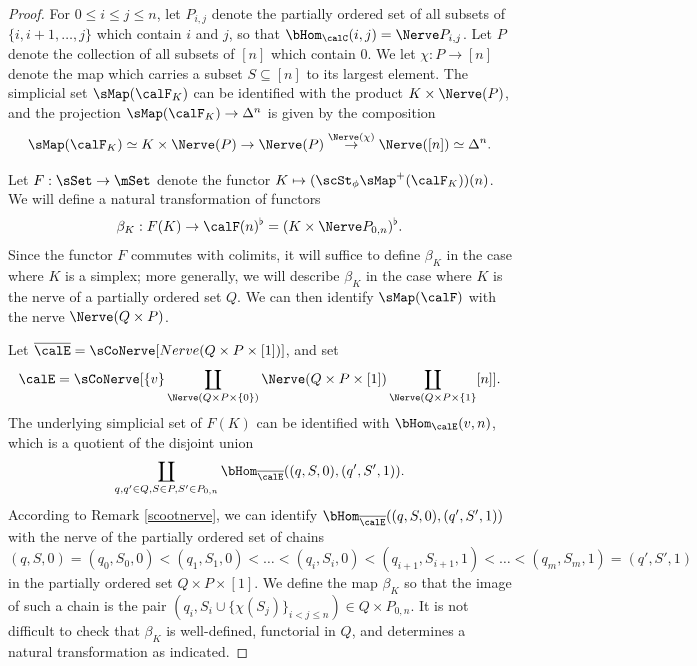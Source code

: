 \begin{proof}
For $0 \leq i \leq j \leq n$, let $P_{i,j}$ denote the partially ordered set of all subsets
of $\{ i, i+1, \ldots, j \}$ which contain $i$ and $j$, so that $\bHom_{\calC}(i,j) = \Nerve P_{i,j}$.
Let $P$ denote the collection of all subsets of $[n]$ which contain $0$.
We let $\chi: P \rightarrow [n]$ denote the map which carries a subset
$S \subseteq [n]$ to its largest element. The simplicial set
$\sMap( \calF_{K} )$ can be identified with the product $K \times \Nerve(P)$, and the
projection $\sMap( \calF_{K} ) \rightarrow \Delta^n$ is given by the composition
$$ \sMap(\calF_{K} ) \simeq K \times \Nerve(P) \rightarrow \Nerve(P) \stackrel{ \Nerve(\chi)}{\rightarrow}
\Nerve( [n] ) \simeq \Delta^n.$$

Let $F: \sSet \rightarrow \mSet$ denote the functor
$K \mapsto (\scSt_{\phi} \sMap^{+}(\calF_K))(n)$. We will define a natural transformation of functors
$$\beta_{K}: F(K) \rightarrow \calF(n)^{\flat} = (K \times \Nerve P_{0,n})^{\flat}.$$
Since the functor $F$ commutes with colimits, it will suffice to define $\beta_{K}$ in the case
where $K$ is a simplex; more generally, we will describe $\beta_{K}$ in the case where
$K$ is the nerve of a partially ordered set $Q$. We can then identify 
$\sMap(\calF)$ with the nerve $\Nerve(Q \times P)$. 

Let $\overline{\calE} = \sCoNerve[ Nerve(Q \times P \times [1] ) ]$, and set
$$ \calE = \sCoNerve[ \{v\} \coprod_{ \Nerve(Q \times P \times \{0\}) } \Nerve(Q \times P \times [1] ) \coprod_{\Nerve( Q \times P \times \{1\}} [n] ].$$
The underlying simplicial set of $F(K)$ can be identified with
$\bHom_{\calE}(v, n)$, which is a quotient of the disjoint union
$$ \coprod_{ q, q' \in Q, S \in P, S' \in P_{0, n}}
\bHom_{\overline{\calE}}( (q,S,0), (q', S', 1) ).$$
According to Remark \ref{scootnerve}, we can identify
$\bHom_{ \overline{\calE} }( (q,S,0), (q', S',1) )$ with the nerve of the partially ordered
set of chains
$$ (q,S,0) = (q_0, S_0,0) <
(q_1, S_1,0) < \ldots < (q_i, S_i, 0)
< (q_{i+1}, S_{i+1}, 1) < \ldots < (q_m, S_m, 1) = (q', S', 1)$$
in the partially ordered set $Q \times P \times [1]$. We define the map $\beta_{K}$ so that
the image of such a chain is the pair $(q_i, S_{i} \cup \{ \chi(S_j) \}_{i < j \leq n})
\in Q \times P_{0,n}$. It is not difficult to check that $\beta_{K}$ is well-defined, functorial in $Q$, and
determines a natural transformation as indicated.


\end{proof}
